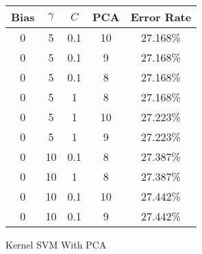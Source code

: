 \begin{center}
\begin{tabular}{|c|c|c|c|c|}
\hline
Bias & $\gamma$ & $C$ & PCA & Error Rate \\
\hline
0 & 5 & 0.1 & 10 & 27.168\% \\
\hline
0 & 5 & 0.1 & 9 & 27.168\% \\
\hline
0 & 5 & 0.1 & 8 & 27.168\% \\
\hline
0 & 5 & 1 & 8 & 27.168\% \\
\hline
0 & 5 & 1 & 10 & 27.223\% \\
\hline
0 & 5 & 1 & 9 & 27.223\% \\
\hline
0 & 10 & 0.1 & 8 & 27.387\% \\
\hline
0 & 10 & 1 & 8 & 27.387\% \\
\hline
0 & 10 & 0.1 & 10 & 27.442\% \\
\hline
0 & 10 & 0.1 & 9 & 27.442\% \\
\hline
\end{tabular}
\end{center}
\caption{Kernel SVM With PCA}\label{tab:svm_rbfpca_acctable}
